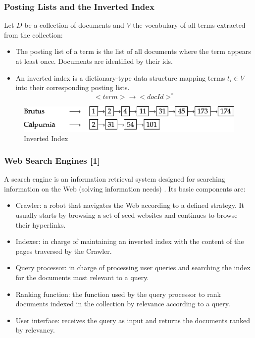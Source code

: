 \documentclass[handout]{beamer}
\begin{document}
\begin{frame}\frametitle{Posting Lists and the Inverted Index}
{\footnotesize Let $D$ be a collection of documents  and $V$ the vocabulary of all terms extracted from the collection:

\begin{itemize}
 \item The posting list of a term is the list of all documents where the term appears at least once. Documents are identified by their ids.
 \item An inverted index is a dictionary-type data structure mapping terms $t_{i} \in V$ into their corresponding posting lists.  
 \begin{displaymath}
  <term> \rightarrow <docId>^*
 \end{displaymath}

\end{itemize}

\begin{figure}[h!]
	\centering
	\includegraphics[scale=0.6]{pics/invFile.png}
	\caption{Inverted Index}
\end{figure}



}
\end{frame}



\begin{frame}\frametitle{Web Search Engines [1]}


{\footnotesize
  A search engine is an information retrieval system designed for searching information on the Web (solving information needs) \cite{manning2008}. Its basic components are:  

\begin{block}


\begin{itemize}
\item Crawler: a robot that navigates the Web according to a defined strategy. It usually starts by browsing a set of seed websites and continues to browse their hyperlinks.
\item Indexer: in charge of maintaining an inverted index with the content of the pages traversed by the Crawler.
\item Query processor: in charge of processing user queries and searching the index for the documents most relevant to a query.
\item Ranking function: the function used by the query processor to rank documents indexed in the collection by relevance according to a query.
\item User interface: receives the query as input and returns the documents ranked by relevancy.
\end{itemize}

\end{block}
}

\end{frame}
\end{document}
